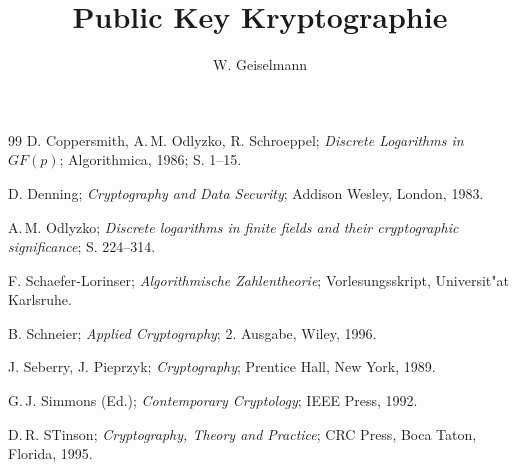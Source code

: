 \documentclass[12pt,twoside]{report}
\title{Public Key Kryptographie}
\author{W. Geiselmann}
\begin{document}

\setcounter{page}{0}
\tableofcontents








\begin{thebibliography}{99}
D. Coppersmith, A.\,M. Odlyzko, R. Schroeppel;
{\em Discrete Logarithms in $GF(p)$};
Algorithmica, 1986; S. 1--15.

D. Denning;
{\em Cryptography and Data Security};
Addison  Wesley, London, 1983.

A.\,M. Odlyzko;
{\em Discrete logarithms in finite fields and their cryptographic 
     significance};
S. 224--314.

F. Schaefer-Lorinser;
{\em Algorithmische Zahlentheorie};
Vorlesungsskript, Universit"at Karlsruhe.

B. Schneier;
{\em Applied Cryptography};
2. Ausgabe, Wiley, 1996.

J. Seberry, J. Pieprzyk;
{\em Cryptography};
Prentice Hall, New York, 1989.

G.\,J. Simmons (Ed.);
{\em Contemporary Cryptology};
IEEE Press, 1992.

D.\,R. STinson;
{\em Cryptography, Theory and Practice};
CRC Press, Boca Taton, Florida, 1995.

\end{thebibliography}
\end{document}
